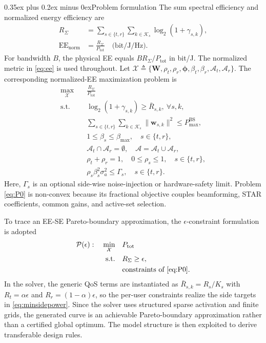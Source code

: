 \documentclass[journal]{IEEEtran}
\makeatletter
\def\section{\@startsection{section}{1}{\z@}{1.2ex plus 0.4ex minus 0.2ex}%
{0.35ex plus 0.2ex minus 0ex}{\normalfont\normalsize\centering\scshape}}%
\makeatother
\begin{document}
\section{Problem formulation}
The sum spectral efficiency and normalized energy efficiency are
\begin{align}
R_\Sigma
&= \sum_{s\in\{t,r\}}\sum_{k\in\mathcal{K}_s}\log_2(1+\gamma_{s,k}),
\label{eq:sumrate}\\
\mathrm{EE}_{\mathrm{norm}}
&= \frac{R_\Sigma}{P_{\mathrm{tot}}}\quad \text{(bit/J/Hz)}.
\label{eq:ee}
\end{align}
For bandwidth $B$, the physical EE equals $BR_\Sigma/P_{\mathrm{tot}}$ in bit/J. The normalized metric in \eqref{eq:ee} is used throughout. Let $\mathcal X\triangleq\{\mathbf W,\rho_t,\rho_r,\bm\phi,\beta_t,\beta_r,\mathcal A_t,\mathcal A_r\}$. The corresponding normalized-EE maximization problem is
\begin{equation}
\begin{aligned}
\max_{\mathcal X}
\quad & \frac{R_\Sigma}{P_{\mathrm{tot}}} \\
\text{s.t.}\quad &
\log_2(1+\gamma_{s,k})\ge \bar{R}_{s,k},\ \forall s,k, \\
&
\sum_{s\in\{t,r\}}\sum_{k\in\mathcal{K}_s}\|\mathbf{w}_{s,k}\|^2 \le P_{\max}^{\mathrm{BS}},\\
&
1\le \beta_s\le \beta_{\max},\quad s\in\{t,r\},\\
&
\mathcal{A}_t\cap\mathcal{A}_r=\emptyset,\quad \mathcal{A}=\mathcal{A}_t\cup\mathcal{A}_r,\\
&
\rho_t+\rho_r=1,\quad 0\le \rho_s\le 1,\quad s\in\{t,r\},\\
&
\rho_s\beta_s^2\sigma_a^2 \le \Gamma_s,\quad s\in\{t,r\}.
\end{aligned}
\label{eq:P0}
\end{equation}
Here, $\Gamma_s$ is an optional side-wise noise-injection or hardware-safety limit. Problem \eqref{eq:P0} is non-convex because its fractional objective couples beamforming, STAR coefficients, common gains, and active-set selection.

To trace an EE-SE Pareto-boundary approximation, the $\epsilon$-constraint formulation is adopted
\begin{equation}
\begin{aligned}
\mathcal{P}(\epsilon):\quad
\min_{\mathcal X}
\quad & P_{\mathrm{tot}} \\
\text{s.t.}\quad &
R_\Sigma \ge \epsilon, \\
& \text{constraints of \eqref{eq:P0}.}
\end{aligned}
\label{eq:epsilon}
\end{equation}
In the solver, the generic QoS terms are instantiated as $\bar R_{s,k}=R_s/K_s$ with $R_t=\alpha\epsilon$ and $R_r=(1-\alpha)\epsilon$, so the per-user constraints realize the side targets in \eqref{eq:minsidepower}. Since the solver uses structured sparse activation and finite grids, the generated curve is an achievable Pareto-boundary approximation rather than a certified global optimum. The model structure is then exploited to derive transferable design rules.
\end{document}

